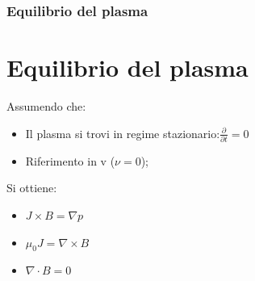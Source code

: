 \documentclass{beamer}
\begin{document}
\begin{frame}
	\frametitle{Equilibrio del plasma}
	\section{Equilibrio del plasma}
	Assumendo che:
	\begin{itemize}
		\item Il plasma si trovi in regime stazionario:\( \frac{\partial}{\partial t}=0\)
		\item Riferimento in v (\(\nu=0\));
	\end{itemize}
	Si ottiene:
	\begin{itemize}
		\item \(J\times B=\nabla p\)
		\item \(\mu_{0}J=\nabla\times B\)
		\item \(\nabla\cdot B=0\)
	\end{itemize}

\end{frame}
\end{document}
